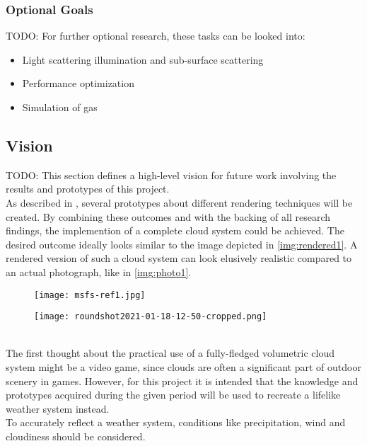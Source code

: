 \subsubsection{Optional Goals}
\color{orange}
TODO: For further optional research, these tasks can be looked into:
\begin{itemize}
    \item Light scattering illumination and sub-surface scattering
    \item Performance optimization
    \item Simulation of gas
\end{itemize}
\color{black}

\clearpage

\subsection{Vision}
\color{orange}
TODO: This section defines a high-level vision for future work involving the results and prototypes of this project. 
\\ 
As described in , several prototypes about different rendering techniques will be created.
By combining these outcomes and with the backing of all research findings, the implemention of a complete cloud system could be achieved. 
The desired outcome ideally looks similar to the image depicted in \autoref{img:rendered1}. A rendered version of such a cloud system can look elusively realistic compared to an actual photograph, like in \autoref{img:photo1}.
\begin{figure}[ht]
    \centering
        \begin{minipage}{0.47\linewidth}
            \texttt{[image: msfs-ref1.jpg]}
            \label{img:rendered1}
        \end{minipage}
    \hfill
        \begin{minipage}{0.47\linewidth}
            \texttt{[image: roundshot2021-01-18-12-50-cropped.png]}
            \label{img:photo1}        
        \end{minipage}  
\end{figure}
\\
The first thought about the practical use of a fully-fledged volumetric cloud system might be a video game, since clouds are often a significant part of outdoor scenery in games.
However, for this project it is intended that the knowledge and prototypes acquired during the given period will be used to recreate a lifelike weather system instead.
\\
To accurately reflect a weather system, conditions like precipitation, wind and cloudiness should be considered.
\color{black}

